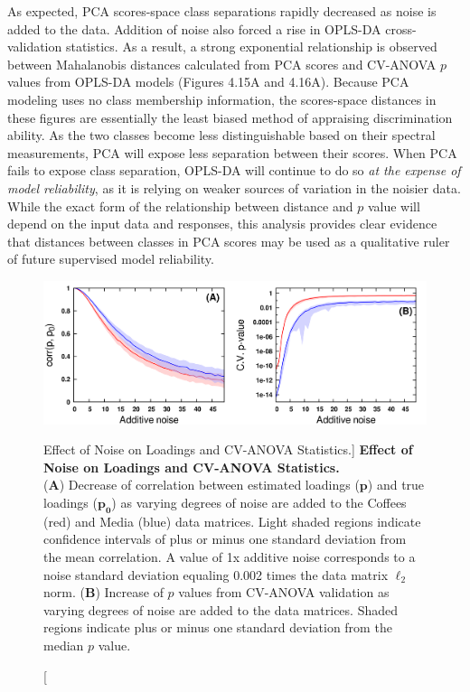 \begin{doublespace}
As expected, PCA scores-space class separations rapidly decreased as noise is
added to the data. Addition of noise also forced a rise in OPLS-DA
cross-validation statistics. As a result, a strong exponential relationship
is observed between Mahalanobis distances calculated from PCA scores and
CV-ANOVA $p$ values from OPLS-DA models (Figures 4.15A and 4.16A). Because
PCA modeling uses no class membership information, the scores-space distances
in these figures are essentially the least biased method of appraising
discrimination ability. As the two classes become less distinguishable based
on their spectral measurements, PCA will expose less separation between their
scores. When PCA fails to expose class separation, OPLS-DA will continue to
do so \emph{at the expense of model reliability}, as it is relying on weaker
sources of variation in the noisier data. While the exact form of the
relationship between distance and $p$ value will depend on the input data and
responses, this analysis provides clear evidence that distances between classes
in PCA scores may be used as a qualitative ruler of future supervised model
reliability.
\end{doublespace}

\begin{figure}[ht!]
\includegraphics[width=6.5in]{figs/apps/17-lines.png}
\caption
      [Effect of Noise on Loadings and CV-ANOVA Statistics.]{
  {\bf Effect of Noise on Loadings and CV-ANOVA Statistics.}
  \\
  ({\bf A}) Decrease of correlation between estimated loadings ($\mathbf{p}$)
  and true loadings ($\mathbf{p_0}$) as varying degrees of noise are added to
  the Coffees (red) and Media (blue) data matrices. Light shaded regions
  indicate confidence intervals of plus or minus one standard deviation from
  the mean correlation. A value of 1x additive noise corresponds to a noise
  standard deviation equaling 0.002 times the data matrix $\ell_2$ norm.
  ({\bf B}) Increase of $p$ values from CV-ANOVA validation as varying degrees
  of noise are added to the data matrices. Shaded regions indicate plus or
  minus one standard deviation from the median $p$ value.
}
\end{figure}

